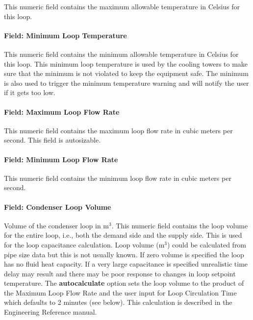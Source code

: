 This numeric field contains the maximum allowable temperature in Celsius for this loop.

\paragraph{Field: Minimum Loop Temperature}\label{field-minimum-loop-temperature-1}

This numeric field contains the minimum allowable temperature in Celsius for this loop. This minimum loop temperature is used by the cooling towers to make sure that the minimum is not violated to keep the equipment safe. The minimum is also used to trigger the minimum temperature warning and will notify the user if it gets too low.

\paragraph{Field: Maximum Loop Flow Rate}\label{field-maximum-loop-flow-rate-1}

This numeric field contains the maximum loop flow rate in cubic meters per second. This field is autosizable.

\paragraph{Field: Minimum Loop Flow Rate}\label{field-minimum-loop-flow-rate-1}

This numeric field contains the minimum loop flow rate in cubic meters per second.

\paragraph{Field: Condenser Loop Volume}\label{field-condenser-loop-volume}

Volume of the condenser loop in m\(^{3}\). This numeric field contains the loop volume for the entire loop, i.e., both the demand side and the supply side. This is used for the loop capacitance calculation. Loop volume (m\(^{3}\)) could be calculated from pipe size data but this is not usually known. If zero volume is specified the loop has no fluid heat capacity. If a very large capacitance is specified unrealistic time delay may result and there may be poor response to changes in loop setpoint temperature. The \textbf{autocalculate} option sets the loop volume to the product of the Maximum Loop Flow Rate and the user input for Loop Circulation Time which defaults to 2 minutes (see below). This calculation is described in the Engineering Reference manual.

